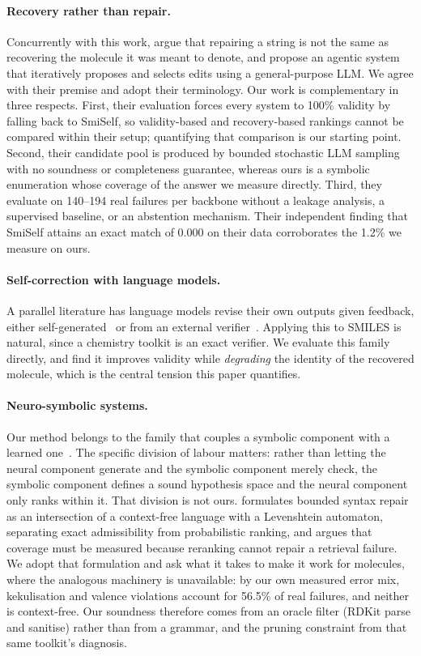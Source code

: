 \documentclass[journal=jcisd8,manuscript=article]{achemso}
\begin{document}
\paragraph{Recovery rather than repair.}
Concurrently with this work, \citet{amrec} argue that repairing a string is not
the same as recovering the molecule it was meant to denote, and propose an
agentic system that iteratively proposes and selects edits using a
general-purpose LLM. We agree with their premise and adopt their
terminology. Our work is complementary in three respects. First, their
evaluation forces every system to 100\% validity by falling back to SmiSelf, so
validity-based and recovery-based rankings cannot be compared within their
setup; quantifying that comparison is our starting point. Second, their
candidate pool is produced by bounded stochastic LLM sampling with no soundness
or completeness guarantee, whereas ours is a symbolic enumeration whose coverage
of the answer we measure directly. Third, they evaluate on 140--194 real
failures per backbone without a leakage analysis, a supervised baseline, or an
abstention mechanism. Their independent finding that SmiSelf attains an exact
match of 0.000 on their data corroborates the 1.2\% we measure on ours.

\paragraph{Self-correction with language models.}
A parallel literature has language models revise their own outputs given
feedback, either self-generated~\citep{madaan2023selfrefine} or from an external
verifier~\citep{gou2024critic,welleck2023generating}. Applying this to SMILES is
natural, since a chemistry toolkit is an exact verifier. We evaluate this family
directly, and find it improves validity while \emph{degrading} the identity of
the recovered molecule, which is the central tension this paper quantifies.

\paragraph{Neuro-symbolic systems.}
Our method belongs to the family that couples a symbolic component with a
learned one~\citep{garcez2023neurosymbolic}. The specific division of labour
matters: rather than letting the neural component generate and the symbolic
component merely check, the symbolic component defines a sound hypothesis space
and the neural component only ranks within it. That division is not ours.
\citet{considine2025syntax} formulates bounded syntax repair as an intersection
of a context-free language with a Levenshtein automaton, separating exact
admissibility from probabilistic ranking, and argues that coverage must be
measured because reranking cannot repair a retrieval failure. We adopt that
formulation and ask what it takes to make it work for molecules, where the
analogous machinery is unavailable: by our own measured error mix, kekulisation
and valence violations account for 56.5\% of real failures, and neither is
context-free. Our soundness therefore comes from an oracle filter (RDKit parse and sanitise)
rather than from a grammar, and the pruning constraint from that same toolkit's
diagnosis.
\end{document}
